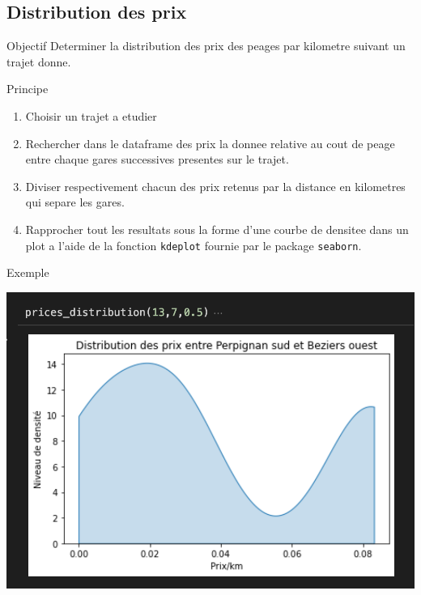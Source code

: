 \documentclass{beamer}
\begin{document}
 \subsection{Distribution des prix}
 \begin{frame}{Objectif}
     Determiner la distribution des prix des peages par kilometre suivant un trajet donne.
 \end{frame}
 
 \begin{frame}{Principe}
     \begin{enumerate}
     \item Choisir un trajet a etudier
         \item Rechercher dans le dataframe des prix la donnee relative au cout de peage entre chaque gares successives presentes sur le trajet.
         \item Diviser respectivement chacun des prix retenus par la distance en kilometres qui separe les gares.
         \item Rapprocher tout les resultats sous la forme d'une courbe de densitee dans un plot a l'aide de la fonction \texttt{kdeplot} fournie par le package \texttt{seaborn}.
     \end{enumerate}
 \end{frame}
 
 \begin{frame}{Exemple}
     \begin{center}
         \includegraphics[scale = 0.6]{prices_distrib.png}
     \end{center}
 \end{frame}
\end{document}
